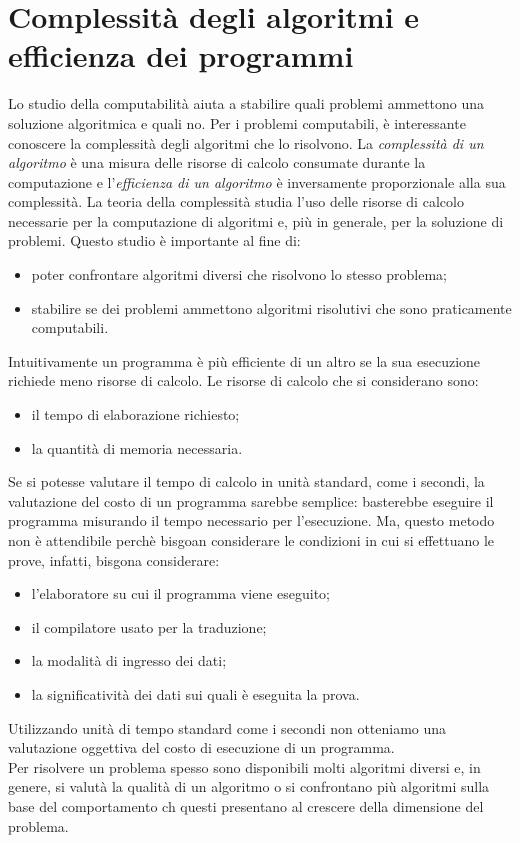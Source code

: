 \documentclass[12pt]{report}
\begin{document}
   	\chapter{Complessità degli algoritmi e efficienza dei programmi}
   	Lo studio della computabilità aiuta a stabilire quali problemi ammettono una soluzione algoritmica e quali no. Per i problemi computabili, è interessante conoscere la complessità degli algoritmi che lo risolvono. La \textit{complessità di un algoritmo} è una misura delle risorse di calcolo consumate durante la computazione e l'\textit{efficienza di un algoritmo} è inversamente proporzionale alla sua complessità. La teoria della complessità studia l'uso delle risorse di calcolo necessarie per la computazione di algoritmi e, più in generale, per la soluzione di problemi. Questo studio è importante al fine di:
   	\begin{itemize}
   		\item poter confrontare algoritmi diversi che risolvono lo stesso problema;
   		\item stabilire se dei problemi ammettono algoritmi risolutivi che sono praticamente computabili.
   	\end{itemize}
   	Intuitivamente un programma è più efficiente di un altro se la sua esecuzione richiede meno risorse di calcolo. Le risorse di calcolo che si considerano sono:
   	\begin{itemize}
   		\item il tempo di elaborazione richiesto;
   		\item la quantità di memoria necessaria.
   	\end{itemize}
   	Se si potesse valutare il tempo di calcolo in unità standard, come i secondi, la valutazione del costo di un programma sarebbe semplice: basterebbe eseguire il programma misurando il tempo necessario per l'esecuzione. Ma, questo metodo non è attendibile perchè bisgoan considerare le condizioni in cui si effettuano le prove, infatti, bisgona considerare:
   	\begin{itemize}
   		\item l'elaboratore su cui il programma viene eseguito;
   		\item il compilatore usato per la traduzione;
   		\item la modalità di ingresso dei dati;
   		\item la significatività dei dati sui quali è eseguita la prova.
   	\end{itemize}
   	Utilizzando unità di tempo standard come i secondi non otteniamo una valutazione oggettiva del costo di esecuzione di un programma. \\
   	Per risolvere un problema spesso sono disponibili molti algoritmi diversi e, in genere, si valutà la qualità di un algoritmo o si confrontano più algoritmi sulla base del comportamento ch questi presentano al crescere della dimensione del problema. \\
\end{document}
